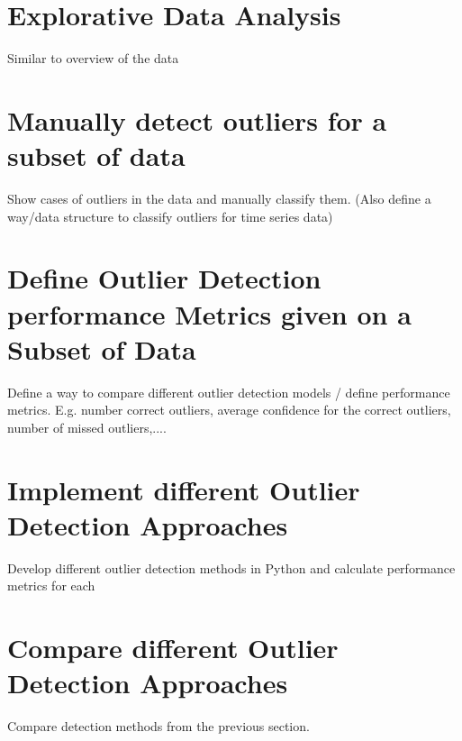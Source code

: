 \section{Explorative Data Analysis}
Similar to overview of the data
\section{Manually detect outliers for a subset of data}
Show cases of outliers in the data and manually classify them. (Also define a way/data structure to classify outliers for time series data)
\section{Define Outlier Detection performance Metrics given on a Subset of Data}
Define a way to compare different outlier detection models / define performance metrics. E.g. number correct outliers, average confidence for the correct outliers, number of missed outliers,.... 
\section{Implement different Outlier Detection Approaches}
Develop different outlier detection methods in Python and calculate performance metrics for each
\section{Compare different Outlier Detection Approaches}
Compare detection methods from the previous section.

